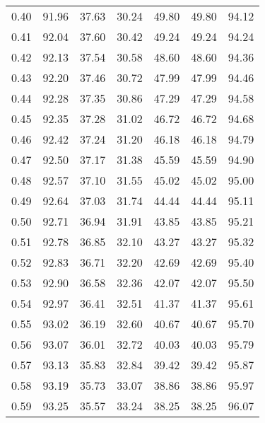 \begin{tabular}{|c|c|c|c|c|c|c|}
      0.40 &     91.96 &     37.63 &      30.24 &   49.80 &      49.80 &         94.12 \\
      0.41 &     92.04 &     37.60 &      30.42 &   49.24 &      49.24 &         94.24 \\
      0.42 &     92.13 &     37.54 &      30.58 &   48.60 &      48.60 &         94.36 \\
      0.43 &     92.20 &     37.46 &      30.72 &   47.99 &      47.99 &         94.46 \\
      0.44 &     92.28 &     37.35 &      30.86 &   47.29 &      47.29 &         94.58 \\
      0.45 &     92.35 &     37.28 &      31.02 &   46.72 &      46.72 &         94.68 \\
      0.46 &     92.42 &     37.24 &      31.20 &   46.18 &      46.18 &         94.79 \\
      0.47 &     92.50 &     37.17 &      31.38 &   45.59 &      45.59 &         94.90 \\
      0.48 &     92.57 &     37.10 &      31.55 &   45.02 &      45.02 &         95.00 \\
      0.49 &     92.64 &     37.03 &      31.74 &   44.44 &      44.44 &         95.11 \\
      0.50 &     92.71 &     36.94 &      31.91 &   43.85 &      43.85 &         95.21 \\
      0.51 &     92.78 &     36.85 &      32.10 &   43.27 &      43.27 &         95.32 \\
      0.52 &     92.83 &     36.71 &      32.20 &   42.69 &      42.69 &         95.40 \\
      0.53 &     92.90 &     36.58 &      32.36 &   42.07 &      42.07 &         95.50 \\
      0.54 &     92.97 &     36.41 &      32.51 &   41.37 &      41.37 &         95.61 \\
      0.55 &     93.02 &     36.19 &      32.60 &   40.67 &      40.67 &         95.70 \\
      0.56 &     93.07 &     36.01 &      32.72 &   40.03 &      40.03 &         95.79 \\
      0.57 &     93.13 &     35.83 &      32.84 &   39.42 &      39.42 &         95.87 \\
      0.58 &     93.19 &     35.73 &      33.07 &   38.86 &      38.86 &         95.97 \\
      0.59 &     93.25 &     35.57 &      33.24 &   38.25 &      38.25 &         96.07 \\

\end{tabular}
